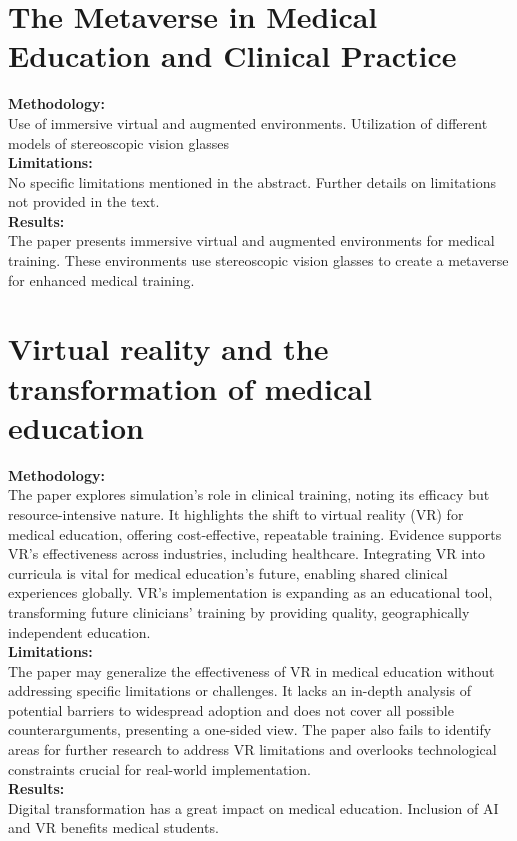 \section{The Metaverse in Medical Education and Clinical Practice\cite{juan2023metaverse}}
\textbf{Methodology:}\\Use of immersive virtual and augmented environments.
Utilization of different models of stereoscopic vision glasses\\
\textbf{Limitations:}\\No specific limitations mentioned in the abstract. Further details on limitations not provided in the text.\\
\textbf{Results:}\\The paper presents immersive virtual and augmented environments for medical training. These environments use stereoscopic vision glasses to create a metaverse for enhanced medical training.
\section{Virtual reality and the transformation of medical education\cite{pottle2019virtual}}
\textbf{Methodology:}\\The paper explores simulation's role in clinical training, noting its efficacy but resource-intensive nature. It highlights the shift to virtual reality (VR) for medical education, offering cost-effective, repeatable training. Evidence supports VR's effectiveness across industries, including healthcare. Integrating VR into curricula is vital for medical education's future, enabling shared clinical experiences globally. VR's implementation is expanding as an educational tool, transforming future clinicians' training by providing quality, geographically independent education.\\
\textbf{Limitations:}\\
The paper may generalize the effectiveness of VR in medical education without addressing specific limitations or challenges. It lacks an in-depth analysis of potential barriers to widespread adoption and does not cover all possible counterarguments, presenting a one-sided view. The paper also fails to identify areas for further research to address VR limitations and overlooks technological constraints crucial for real-world implementation.\\
\textbf{Results:}\\Digital transformation has a great impact on medical education.
Inclusion of AI and VR benefits medical students.
